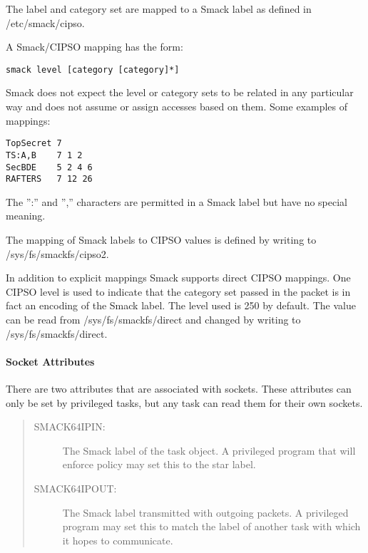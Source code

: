 \documentclass[a4paper,8pt,english]{sphinxmanual}
\begin{document}
The label and category set are mapped to a Smack label as defined in
/etc/smack/cipso.

A Smack/CIPSO mapping has the form:

\begin{Verbatim}[commandchars=\\\{\}]
smack level [category [category]*]
\end{Verbatim}

Smack does not expect the level or category sets to be related in any
particular way and does not assume or assign accesses based on them. Some
examples of mappings:

\begin{Verbatim}[commandchars=\\\{\}]
TopSecret 7
TS:A,B    7 1 2
SecBDE    5 2 4 6
RAFTERS   7 12 26
\end{Verbatim}

The '':'' and '','' characters are permitted in a Smack label but have no special
meaning.

The mapping of Smack labels to CIPSO values is defined by writing to
/sys/fs/smackfs/cipso2.

In addition to explicit mappings Smack supports direct CIPSO mappings. One
CIPSO level is used to indicate that the category set passed in the packet is
in fact an encoding of the Smack label. The level used is 250 by default. The
value can be read from /sys/fs/smackfs/direct and changed by writing to
/sys/fs/smackfs/direct.


\paragraph{Socket Attributes}
\label{admin-guide/LSM/Smack:socket-attributes}
There are two attributes that are associated with sockets. These attributes
can only be set by privileged tasks, but any task can read them for their own
sockets.
\begin{quote}
\begin{description}
\item[{SMACK64IPIN:}] \leavevmode
The Smack label of the task object. A privileged
program that will enforce policy may set this to the star label.

\item[{SMACK64IPOUT:}] \leavevmode
The Smack label transmitted with outgoing packets.
A privileged program may set this to match the label of another
task with which it hopes to communicate.

\end{description}
\end{quote}
\end{document}
